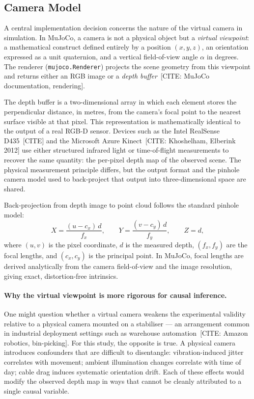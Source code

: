 \documentclass[journal]{IEEEtran}
\begin{document}
\subsection{Camera Model}
\label{sec:camera_model}

A central implementation decision concerns the nature of the virtual camera
in simulation.  In MuJoCo, a camera is not a physical object but a
\emph{virtual viewpoint}: a mathematical construct defined entirely by a
position $(x, y, z)$, an orientation expressed as a unit quaternion, and a
vertical field-of-view angle $\alpha$ in degrees.  The renderer
(\texttt{mujoco.Renderer}) projects the scene geometry from this viewpoint
and returns either an RGB image or a \emph{depth buffer}~[CITE: MuJoCo
documentation, rendering].

The depth buffer is a two-dimensional array in which each element stores the
perpendicular distance, in metres, from the camera's focal point to the
nearest surface visible at that pixel.  This representation is
mathematically identical to the output of a real RGB-D sensor.  Devices
such as the Intel RealSense D435~[CITE] and the Microsoft Azure
Kinect~[CITE: Khoshelham, Elberink 2012] use either structured infrared
light or time-of-flight measurements to recover the same quantity: the
per-pixel depth map of the observed scene.  The physical measurement
principle differs, but the output format and the pinhole camera model used
to back-project that output into three-dimensional space are shared.

Back-projection from depth image to point cloud follows the standard pinhole
model:
\begin{equation}
  X = \frac{(u - c_x)\,d}{f_x}, \qquad
  Y = \frac{(v - c_y)\,d}{f_y}, \qquad
  Z = d,
  \label{eq:backproject}
\end{equation}
where $(u,v)$ is the pixel coordinate, $d$ is the measured depth,
$(f_x, f_y)$ are the focal lengths, and $(c_x, c_y)$ is the principal
point.  In MuJoCo, focal lengths are derived analytically from the
camera field-of-view and the image resolution, giving exact,
distortion-free intrinsics.

\paragraph{Why the virtual viewpoint is more rigorous for causal inference.}
One might question whether a virtual camera weakens the experimental
validity relative to a physical camera mounted on a stabiliser --- an
arrangement common in industrial deployment settings such as warehouse
automation~[CITE: Amazon robotics, bin-picking].  For this study, the
opposite is true.  A physical camera introduces confounders that are
difficult to disentangle: vibration-induced jitter correlates with movement;
ambient illumination changes correlate with time of day; cable drag induces
systematic orientation drift.  Each of these effects would modify the
observed depth map in ways that cannot be cleanly attributed to a single
causal variable.
\end{document}
